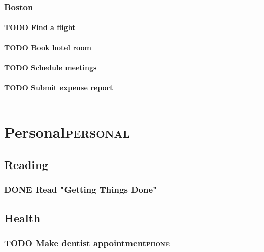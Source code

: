 \documentclass[11pt]{article}
\begin{document}
\subsubsection*{Boston}
\label{sec:org4510e59}

\paragraph*{{\bfseries\sffamily TODO} Find a flight}
\label{sec:orge833028}

\paragraph*{{\bfseries\sffamily TODO} Book hotel room}
\label{sec:orge084ab6}

\paragraph*{{\bfseries\sffamily TODO} Schedule meetings}
\label{sec:orgd4bc3ce}

\paragraph*{{\bfseries\sffamily TODO} Submit expense report}
\label{sec:orga16bd98}

\noindent\rule{\textwidth}{0.5pt}

\section{Personal\hfill{}\textsc{personal}}
\label{sec:org38f1b21}
\subsection{Reading}
\label{sec:orgc4323b3}

\subsubsection*{{\bfseries\sffamily DONE} Read "Getting Things Done"}
\label{sec:orgb454ed7}

\subsection{Health}
\label{sec:org1e473e2}

\subsubsection*{{\bfseries\sffamily TODO} Make dentist appointment\hfill{}\textsc{phone}}
\label{sec:org2432f02}
\end{document}
